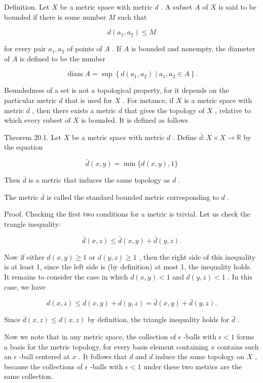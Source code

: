 \documentclass[10pt]{article}
\begin{document}
Definition. Let \(X\) be a metric space with metric \(d\) . A subset \(A\) of \(X\) is said to be bounded if there is some number \(M\) such that

\[
d\left( {{a}_{1},{a}_{2}}\right)  \leq  M
\]

for every pair \({a}_{1},{a}_{2}\) of points of \(A\) . If \(A\) is bounded and nonempty, the diameter of \(A\) is defined to be the number

\[
\operatorname{diam}A = \sup \left\{  {d\left( {{a}_{1},{a}_{2}}\right)  \mid  {a}_{1},{a}_{2} \in  A}\right\}  .
\]

Boundedness of a set is not a topological property, for it depends on the particular metric \(d\) that is used for \(X\) . For instance, if \(X\) is a metric space with metric \(d\) , then there exists a metric \(d\) that gives the topology of \(X\) , relative to which every subset of \(X\) is bounded. It is defined as follows

Theorem 20.1. Let \(X\) be a metric space with metric \(d\) . Define \(\bar{d} : X \times  X \rightarrow  \mathbb{R}\) by the equation

\[
\bar{d}\left( {x,y}\right)  = \min \{ d\left( {x,y}\right) ,1\}
\]

Then \(\bar{d}\) is a metric that induces the same topology as \(d\) .

The metric \(\bar{d}\) is called the standard bounded metric corresponding to \(d\) .

Proof. Checking the first two conditions for a metric is trivial. Let us check the trangle inequality:

\[
\bar{d}\left( {x,z}\right)  \leq  \bar{d}\left( {x,y}\right)  + \bar{d}\left( {y,z}\right) .
\]

Now if either \(d\left( {x,y}\right)  \geq  1\) or \(d\left( {y,z}\right)  \geq  1\) , then the right side of this inequality is at least 1, since the left side is (by definition) at most 1, the inequality holds. It remains to consider the case in which \(d\left( {x,y}\right)  < 1\) and \(d\left( {y,z}\right)  < 1\) . In this case, we have

\[
d\left( {x,z}\right)  \leq  d\left( {x,y}\right)  + d\left( {y,z}\right)  = \bar{d}\left( {x,y}\right)  + \bar{d}\left( {y,z}\right) .
\]

Since \(\bar{d}\left( {x,z}\right)  \leq  d\left( {x,z}\right)\) by definition, the triangle inequality holds for \(\bar{d}\) .

Now we note that in any metric space, the collection of \(\epsilon\) -balls with \(\epsilon  < 1\) forms a basis for the metric topology, for every basis element containing \(x\) contains such an \(\epsilon\) -ball centered at \(x\) . It follows that \(d\) and \(d\) induce the same topology on \(X\) , because the collections of \(\epsilon\) -balls with \(\epsilon  < 1\) under these two metrics are the same collection.
\end{document}
